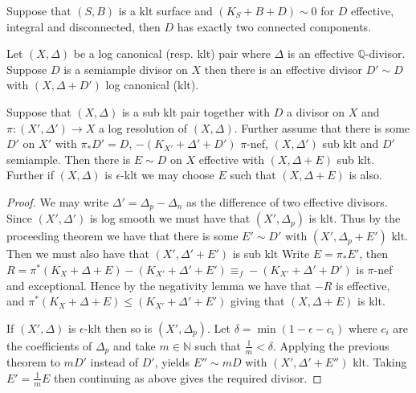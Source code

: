 	\begin{lemma}\label{cc} \cite[Proposition 4.37]{kk-singbook}
		Suppose that $(S,B)$ is a klt surface and $(K_{S}+B+D) \sim 0$ for $D$ effective, integral and disconnected, then $D$ has exactly two connected components.
	\end{lemma}

	
\begin{theorem}\cite[Theorem 1]{tanaka2017semiample}
	Let $(X,\Delta)$ be a log canonical (resp. klt) pair where $\Delta$ is an effective $\mathbb{Q}$-divisor. Suppose $D$ is a semiample divisor on $X$ then there is an effective divisor $D'\sim D$ with $(X,\Delta+D')$ log canonical (klt).
\end{theorem}

\begin{corollary}\label{average}
	Suppose that $(X,\Delta)$ is a sub klt pair together with $D$ a divisor on $X$ and $\pi\colon (X',\Delta') \to X$ a log resolution of $(X,\Delta)$. Further assume that there is some $D'$ on $X'$ with $\pi_{*}D'=D$, $-(K_{X'}+\Delta'+D')$ $\pi$-nef, $(X,\Delta')$ sub klt and $D'$ semiample. Then there is $E \sim D$ on $X$ effective with $(X,\Delta+E)$ sub klt. Further if $(X,\Delta)$ is $\epsilon$-klt we may choose $E$ such that $(X,\Delta+E)$ is also.
\end{corollary}
\begin{proof}
	We may write $\Delta'=\Delta_{p}-\Delta_{n}$ as the difference of two effective divisors. Since $(X',\Delta')$ is log smooth we must have that $(X',\Delta_{p})$ is klt. Thus by the proceeding theorem we have that there is some $E' \sim D'$ with $(X',\Delta_{p}+E')$ klt. Then we must also have that $(X',\Delta'+E')$ is sub klt 
	Write $E=\pi_{*}E'$, then $R=\pi^{*}(K_{X}+\Delta+E)- (K_{X'}+\Delta'+E')\equiv_{f}-(K_{X'}+\Delta'+D')$ is $\pi$-nef and exceptional. Hence by the negativity lemma we have that $-R$ is effective, and $\pi^{*}(K_{X}+\Delta+E) \leq (K_{X'}+\Delta'+E')$ giving that $(X,\Delta +E)$ is klt.
	
	If $(X',\Delta)$ is $\epsilon$-klt then so is $(X',\Delta_{p})$. Let $\delta =\min (1-\epsilon-c_{i})$ where $c_{i}$ are the coefficients of $\Delta_{p}$ and take $m \in \mathbb{N}$ such that $\frac{1}{m} < \delta$. Applying the previous theorem to $mD'$ instead of $D'$, yields $E'' \sim mD$ with $(X',\Delta'+E'')$ klt. Taking $E'=\frac{1}{m}E$ then continuing as above gives the required divisor. 
\end{proof}

